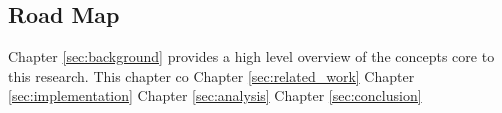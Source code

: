 \subsection{Road Map}

Chapter \ref{sec:background} provides a high level overview of the concepts core to this research. This chapter co
Chapter \ref{sec:related_work}
Chapter \ref{sec:implementation}
Chapter \ref{sec:analysis}
Chapter \ref{sec:conclusion}